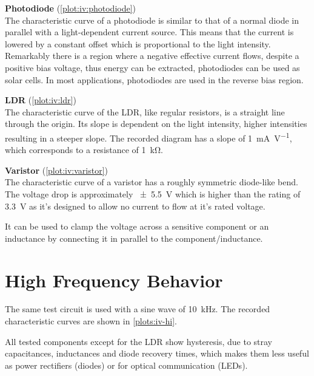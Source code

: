 \textbf{Photodiode} (\autoref{plot:iv:photodiode})\\
The characteristic curve of a photodiode is similar to that of a normal diode in parallel with a light-dependent current source.
This means that the current is lowered by a constant offset which is proportional to the light intensity.
Remarkably there is a region where a negative effective current flows, despite a positive bias voltage, thus energy can be extracted, photodiodes can be used as solar cells.
In most applications, photodiodes are used in the reverse bias region.

\textbf{LDR} (\autoref{plot:iv:ldr})\\
The characteristic curve of the LDR, like regular resistors, is a straight line through the origin.
Its slope is dependent on the light intensity, higher intensities resulting in a steeper slope.
The recorded diagram has a slope of \SI{1}{\mA\per\volt}, which corresponds to a resistance of \SI{1}{\kilo\ohm}.

\textbf{Varistor} (\autoref{plot:iv:varistor})\\
The characteristic curve of a varistor has a roughly symmetric diode-like bend.
The voltage drop is approximately \SI{\pm 5.5}{\volt} which is higher than the rating of \SI{3.3}{\volt} as it's designed to allow no current to flow at it's rated voltage.

It can be used to clamp the voltage across a sensitive component or an inductance by connecting it in parallel to the component/inductance.

\section{High Frequency Behavior}

The same test circuit is used with a sine wave of \SI{10}{\kHz}.
The recorded characteristic curves are shown in \autoref{plots:iv-hi}.

All tested components except for the LDR show hysteresis, due to stray capacitances, inductances and diode recovery times, which makes them less useful as power rectifiers (diodes) or for optical communication (LEDs).

